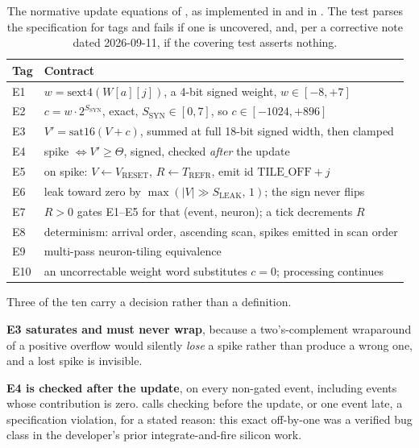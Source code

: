 \begin{table}[tbp]
\centering
\caption{The normative update equations of , as
implemented in  and in
. The test
 parses the specification for tags
and fails if one is uncovered, and, per a corrective note dated
2026-09-11, if the covering test asserts nothing.}
\label{tab:npu-eqs}
\small
\begin{tabularx}{\linewidth}{@{}lX@{}}
\toprule
\textbf{Tag} & \textbf{Contract} \\
\midrule
E1 & $w = \mathrm{sext4}(W[a][j])$, a 4-bit signed weight, $w \in [-8,+7]$ \\
E2 & $c = w \cdot 2^{S_{\mathrm{SYN}}}$, exact, $S_{\mathrm{SYN}} \in [0,7]$, so $c \in [-1024,+896]$ \\
E3 & $V' = \mathrm{sat16}(V + c)$, summed at full 18-bit signed width, then clamped \\
E4 & spike $\iff V' \geq \Theta$, signed, checked \emph{after} the update \\
E5 & on spike: $V \leftarrow V_{\mathrm{RESET}}$, $R \leftarrow T_{\mathrm{REFR}}$, emit id $\mathrm{TILE\_OFF}+j$ \\
E6 & leak toward zero by $\max(|V| \gg S_{\mathrm{LEAK}},\,1)$; the sign never flips \\
E7 & $R>0$ gates E1--E5 for that (event, neuron); a tick decrements $R$ \\
E8 & determinism: arrival order, ascending scan, spikes emitted in scan order \\
E9 & multi-pass neuron-tiling equivalence \\
E10 & an uncorrectable weight word substitutes $c=0$; processing continues \\
\bottomrule
\end{tabularx}
\end{table}

Three of the ten carry a decision rather than a definition.

\textbf{E3 saturates and must never wrap}, because a two's-complement
wraparound of a positive overflow would silently \emph{lose} a spike
rather than produce a wrong one, and a lost spike is invisible.

\textbf{E4 is checked after the update}, on every non-gated event,
including events whose contribution is zero. 
calls checking before the update, or one event late, a specification
violation, for a stated reason: this exact off-by-one was a verified
bug class in the developer's prior integrate-and-fire silicon work.

